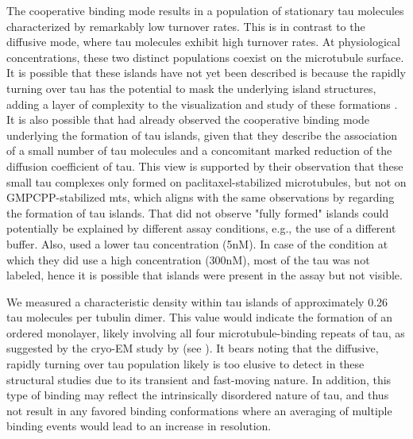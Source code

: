 The cooperative binding mode results in a population of stationary tau molecules characterized by remarkably low turnover rates. This is in contrast to the diffusive mode, where tau molecules exhibit high turnover rates. At physiological concentrations, these two distinct populations coexist on the microtubule surface. It is possible that these islands have not yet been described is because the rapidly turning over tau has the potential to mask the underlying island structures, adding a layer of complexity to the visualization and study of these formations . It is also possible that \cite{Mcvicker2014} had already observed the cooperative binding mode underlying the formation of tau islands, given that they describe the association of a small number of tau molecules and a concomitant marked reduction of the diffusion coefficient of tau. This view is supported by their observation that these small tau complexes only formed on paclitaxel-stabilized microtubules, but not on GMPCPP-stabilized mts, which aligns with the same observations by \cite{tan2019microtubules} regarding the formation of tau islands. That \cite{Mcvicker2014} did not observe "fully formed" islands could potentially be explained by different assay conditions, e.g., the use of a different buffer. Also, \cite{Mcvicker2014} used a lower tau concentration (5nM). In case of the condition at which they did use a high concentration (300nM), most of the tau was not labeled, hence it is possible that islands were present in the assay but not visible.\par

We measured a characteristic density within tau islands of approximately 0.26 tau molecules per tubulin dimer. This value would indicate the formation of an ordered monolayer, likely involving all four microtubule-binding repeats of tau, as suggested by the cryo-EM study by \cite{Kellogg2018} (see ). It bears noting that the diffusive, rapidly turning over tau population likely is too elusive to detect in these structural studies due to its transient and fast-moving nature. In addition, this type of binding may reflect the intrinsically disordered nature of tau, and thus not result in any favored binding conformations where an averaging of multiple binding events would lead to an increase in resolution.\par 

